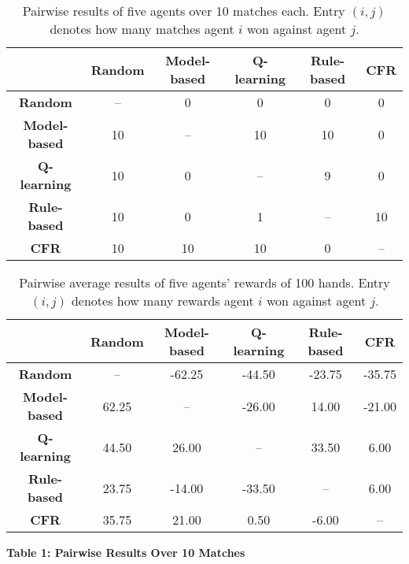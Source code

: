 \documentclass{article}
\begin{document}
\begin{table}[h]
    \centering
    \begin{tabular}{c|ccccc}
     & \textbf{Random} & \textbf{Model-based} & \textbf{Q-learning} & \textbf{Rule-based} & \textbf{CFR} \\
    \hline
    \textbf{Random}  & -- & 0  & 0  & 0  & 0  \\
    \textbf{Model-based}  & 10 & -- & 10 & 10 & 0  \\
    \textbf{Q-learning}  & 10 & 0  & -- & 9  & 0  \\
    \textbf{Rule-based} & 10 & 0  & 1  & -- & 10 \\
    \textbf{CFR}  & 10 & 10 & 10 & 0  & -- \\
    \end{tabular}
    \caption{Pairwise results of five agents over 10 matches each. Entry \((i,j)\) denotes how many matches agent \(i\) won against agent \(j\).}
    \label{tab:pairwise-results}
    \end{table}
\begin{table}[h]
    \centering
    \begin{tabular}{c|ccccc}
     & \textbf{Random} & \textbf{Model-based} & \textbf{Q-learning} & \textbf{Rule-based} & \textbf{CFR} \\
    \hline
    \textbf{Random}  & -- & -62.25  &  -44.50 & -23.75  & -35.75  \\
    \textbf{Model-based}  & 62.25 & -- & -26.00 & 14.00 & -21.00  \\
    \textbf{Q-learning}  & 44.50 & 26.00  & -- & 33.50  & 6.00  \\
    \textbf{Rule-based} & 23.75 & -14.00  & -33.50  & -- & 6.00 \\
    \textbf{CFR}  & 35.75 & 21.00 & 0.50 & -6.00  & -- \\
    \end{tabular}
    \caption{Pairwise average results of five agents' rewards of 100 hands. Entry \((i,j)\) denotes how many rewards agent \(i\) won against agent \(j\).}
    \label{tab:pairwise-results}
    \end{table}
    \textbf{Table 1: Pairwise Results Over 10 Matches}
\end{document}
